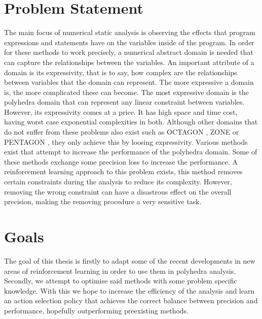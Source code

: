 \section{Problem Statement}
The main focus of numerical static analysis is observing the effects that program expressions and statements have on the variables inside of the program. In order for these methods to work precisely, a numerical abstract domain is needed that can capture the relationships between the variables. An important attribute of a domain is its expressivity, that is to say, how complex are the relationships between variables that the domain can represent. The more expressive a domain is, the more complicated these can become. The most expressive domain is the polyhedra domain that can represent any linear constraint between variables. However, its expressivity comes at a price. It has high space and time cost, having worst case exponential complexities in both. Although other domains that do not suffer from these problems also exist such as OCTAGON \cite{mine2006octagon}, ZONE \cite{mine2001new} or PENTAGON \cite{logozzo2010pentagons}, they only achieve this by loosing expressivity. Various methods exist that attempt to increase the performance of the polyhedra domain. Some of these methods exchange some precision loss to increase the performance. A reinforcement learning approach to this problem exists, this method removes certain constraints during the analysis to reduce its complexity.  However, removing the wrong constraint can have a disastrous effect on the overall precision, making the removing procedure a very sensitive task.
\section{Goals}
The goal of this thesis is firstly to adapt some of the recent developments in new areas of reinforcement learning in order to use them in polyhedra analysis. Secondly, we attempt to optimise said methods with some problem specific knowledge. With this we hope to increase the efficiency of the analysis and learn an action selection policy that achieves the correct balance between precision and performance, hopefully outperforming preexisting methods.

